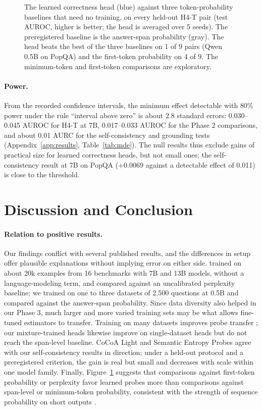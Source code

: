 \documentclass[10pt]{article}
\begin{document}
\begin{figure}[t]
\centering

\caption{The learned correctness head (blue) against three token-probability baselines that need no training, on every held-out H4-T pair (test AUROC, higher is better; the head is averaged over 5 seeds). The preregistered baseline is the answer-span probability (gray). The head beats the best of the three baselines on 1 of 9 pairs (Qwen 0.5B on PopQA) and the first-token probability on 4 of 9. The minimum-token and first-token comparisons are exploratory.}
\label{fig:baselines}
\end{figure}

\paragraph{Power.} From the recorded confidence intervals, the minimum effect detectable with 80\% power under the rule ``interval above zero'' is about $2.8$ standard errors: 0.030--0.045 AUROC for H4-T at 7B, 0.017--0.033 AUROC for the Phase 2 comparisons, and about 0.01 AURC for the self-consistency and grounding tests (Appendix~\ref{app:results}, Table~\ref{tab:mde}). The null results thus exclude gains of practical size for learned correctness heads, but not small ones; the self-consistency result at 7B on PopQA (+0.0069 against a detectable effect of 0.011) is close to the threshold.

\section{Discussion and Conclusion}
\label{sec:discussion}

\paragraph{Relation to positive results.} Our findings conflict with several published results, and the differences in setup offer plausible explanations without implying error on either side. \citet{kapoor2024large} trained on about 20k examples from 16 benchmarks with 7B and 13B models, without a language-modeling term, and compared against an uncalibrated perplexity baseline; we trained on one to three datasets of 2,500 questions at 0.5B and compared against the answer-span probability. Since data diversity also helped in our Phase 3, much larger and more varied training sets may be what allows fine-tuned estimators to transfer. Training on many datasets improves probe transfer \citep{liu2024universal,liu2024supervised}; our mixture-trained heads likewise improve on single-dataset heads but do not reach the span-level baseline. CoCoA Light and Semantic Entropy Probes \citep{vashurin2025cocoa,kossen2024semantic} agree with our self-consistency results in direction; under a held-out protocol and a preregistered criterion, the gain is real but small and decreases with scale within one model family. Finally, Figure~\ref{fig:baselines} suggests that comparisons against first-token probability or perplexity favor learned probes more than comparisons against span-level or minimum-token probability, consistent with the strength of sequence probability on short outputs \citep{vashurin2025benchmarking}.
\end{document}
